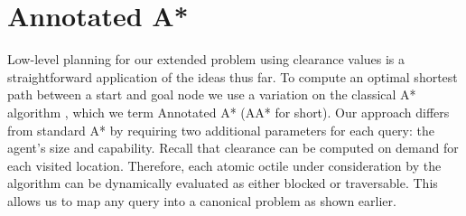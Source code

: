 \section{Annotated A*}
\label{aha:aastar}
Low-level planning for our extended problem using clearance values is a straightforward application of the ideas thus far.
To compute an optimal shortest path between a start and goal node we use a variation on the classical A* algorithm \cite{astar}, which we term Annotated A* (AA* for short). 
Our approach differs from standard A* by requiring two additional parameters for each query: the agent's size and capability. 
Recall that clearance can be computed on demand for each visited location. 
Therefore, each atomic octile under consideration by the algorithm can be dynamically evaluated as either blocked or traversable.
This allows us to map any query into a canonical problem as shown earlier.
